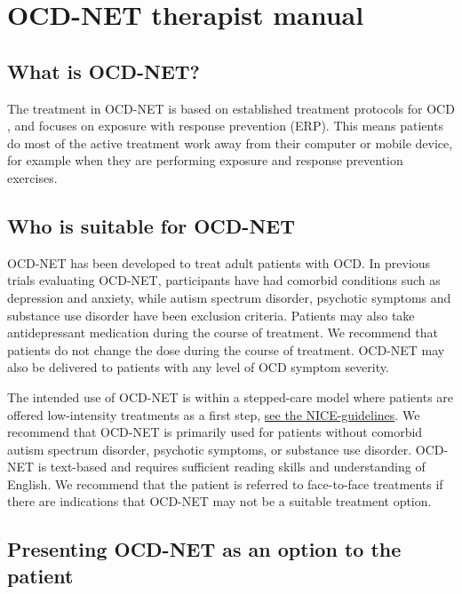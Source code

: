 \documentclass[]{book}
\theoremstyle{definition}
\theoremstyle{definition}
\theoremstyle{definition}
\theoremstyle{remark}
\begin{document}
\hypertarget{ocd-net-therapist-manual}{%
\chapter{OCD-NET therapist manual}\label{ocd-net-therapist-manual}}

\hypertarget{what-is-ocd-net}{%
\section{What is OCD-NET?}\label{what-is-ocd-net}}

The treatment in OCD-NET is based on established treatment protocols for
OCD \citep{foa2012}, and focuses on exposure with response prevention
(ERP). This means patients do most of the active treatment work away
from their computer or mobile device, for example when they are
performing exposure and response prevention exercises.

\hypertarget{who-is-suitable-for-ocd-net}{%
\section{Who is suitable for
OCD-NET}\label{who-is-suitable-for-ocd-net}}

OCD-NET has been developed to treat adult patients with OCD. In previous
trials evaluating OCD-NET, participants have had comorbid conditions
such as depression and anxiety, while autism spectrum disorder,
psychotic symptoms and substance use disorder have been exclusion
criteria. Patients may also take antidepressant medication during the
course of treatment. We recommend that patients do not change the dose
during the course of treatment. OCD-NET may also be delivered to
patients with any level of OCD symptom severity.

The intended use of OCD-NET is within a stepped-care model where
patients are offered low-intensity treatments as a first step,
\href{https://www.nice.org.uk/guidance/CG31/chapter/1-Guidance\#stepped-care-for-adults-young-people-and-children-with-ocd-or-bdd}{see
the NICE-guidelines}. We recommend that OCD-NET is primarily used for
patients without comorbid autism spectrum disorder, psychotic symptoms,
or substance use disorder. OCD-NET is text-based and requires sufficient
reading skills and understanding of English. We recommend that the
patient is referred to face-to-face treatments if there are indications
that OCD-NET may not be a suitable treatment option.

\hypertarget{presenting-ocd-net-as-an-option-to-the-patient}{%
\section{Presenting OCD-NET as an option to the
patient}\label{presenting-ocd-net-as-an-option-to-the-patient}}
\end{document}
